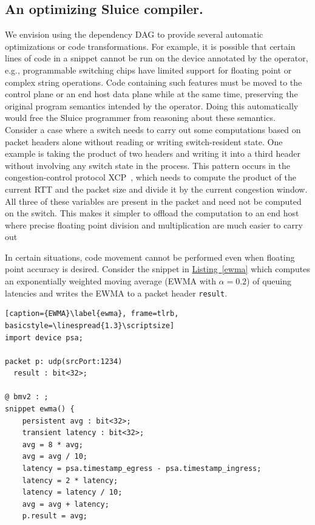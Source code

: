 \documentclass[12pt, oneside]{article}
\newcommand{\irref}[2]{\hyperref[#2]{#1~\ref{#2}}}
\begin{document}
\subsection{An optimizing Sluice compiler.} We envision using the dependency DAG to
provide several automatic optimizations or code transformations. For example,
it is possible that certain lines of code in a snippet cannot be run on the
device annotated by the operator, e.g., programmable switching chips have
limited support for floating point or complex string operations. Code
containing such features must be moved to the control plane or an end host data
plane while at the same time, preserving the original program semantics
intended by the operator. Doing this automatically would free the Sluice
programmer from reasoning about these semantics. Consider a case where a switch needs to carry out some computations based on packet headers alone without reading or writing switch-resident state. One example is taking the product of two headers and writing it into a third header without involving any switch state in the process. This pattern occurs in the congestion-control protocol XCP~\cite{xcp}, which needs to compute the product of the current RTT and the packet size and divide it by the current congestion window. All three of these variables are present in the packet and need not be computed on the switch. This makes it simpler to offload the computation to an end host where precise floating point division and multiplication are much easier to carry out~\cite{sharma}

In certain situations, code movement cannot be performed even when floating point accuracy is desired. Consider the snippet in \irref{Listing}{ewma} which computes an exponentially weighted moving average (EWMA with $\alpha=0.2$) of queuing latencies and writes the EWMA to a packet header \texttt{result}. 

\begin{lstlisting}[caption={EWMA}\label{ewma}, frame=tlrb, basicstyle=\linespread{1.3}\scriptsize]
import device psa;

packet p: udp(srcPort:1234)
  result : bit<32>;

@ bmv2 : ;
snippet ewma() {
    persistent avg : bit<32>;
    transient latency : bit<32>;
    avg = 8 * avg;
    avg = avg / 10;
    latency = psa.timestamp_egress - psa.timestamp_ingress;
    latency = 2 * latency;
    latency = latency / 10;
    avg = avg + latency;
    p.result = avg;
\end{lstlisting}
\end{document}
